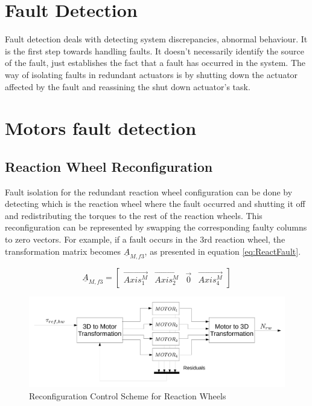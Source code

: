\section{Fault Detection}

Fault detection deals with detecting system discrepancies, abnormal behaviour. It is the first step towards handling faults. It doesn't necessarily identify the source of the fault, just establishes the fact that a fault has occurred in the system. The way of isolating faults in redundant actuators is by shutting down the actuator affected by the fault and reassining the shut down actuator's task.


\section{Motors fault detection}





\subsection{Reaction Wheel Reconfiguration}
Fault isolation for the redundant reaction wheel configuration can be done by detecting which is the reaction wheel where the fault occurred and shutting it off and redistributing the torques to the rest of the reaction wheels. This reconfiguration can be represented by swapping the corresponding faulty columns to zero vectors. For example, if a fault occurs in the 3rd reaction wheel, the transformation matrix becomes $\underline{A}_{M,f3}$, as presented in equation \ref{eq:ReactFault}.

\begin{equation}
\label{eq:ReactFault}
\underline{A}_{M,f3} = \begin{bmatrix}
\vec{Axis^{M}_{1}}       & \vec{Axis^{M}_{2}}   & \vec{0}   & \vec{Axis^{M}_{4}} 
\end{bmatrix} 
\end{equation}

\begin{figure}[H]
	\centering 
	\includegraphics[width=170mm]{figures/reconfigure.pdf}	
	\caption{Reconfiguration Control Scheme for Reaction Wheels}
	\label{fig:reconfig}
\end{figure}

